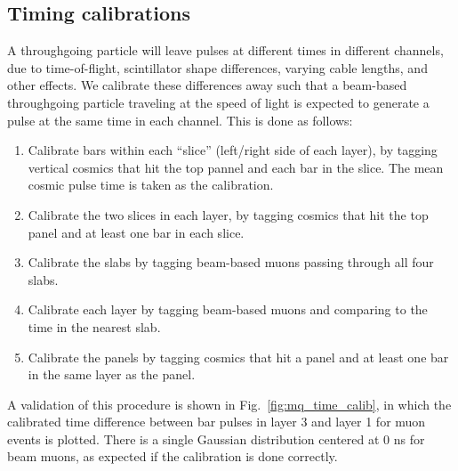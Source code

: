 {\subsection{Timing calibrations}
A throughgoing particle will leave pulses at different times in different channels,
due to time-of-flight, scintillator shape differences, varying cable lengths,
and other effects. We calibrate these differences away such that a beam-based
throughgoing particle traveling at the speed of light is expected to generate
a pulse at the same time in each channel. This is done as follows:
\begin{enumerate}\setlength\itemsep{-1mm}
\item Calibrate bars within each ``slice'' (left/right side of each layer),
by tagging vertical cosmics that hit the top pannel and each bar in the slice.
The mean cosmic pulse time is taken as the calibration.
\item Calibrate the two slices in each layer, by tagging cosmics that
hit the top panel and at least one bar in each slice.
\item Calibrate the slabs by tagging beam-based muons passing through
all four slabs.
\item Calibrate each layer by tagging beam-based muons and comparing
to the time in the nearest slab.
\item Calibrate the panels by tagging cosmics that hit a panel
and at least one bar in the same layer as the panel.
\end{enumerate}

A validation of this procedure is shown in Fig.~\ref{fig:mq_time_calib}, in which
the calibrated time difference between bar pulses in layer 3 and layer 1 for muon events
is plotted. There is a single Gaussian distribution centered at 0 ns for beam 
muons, as expected if the calibration is done correctly.

}
